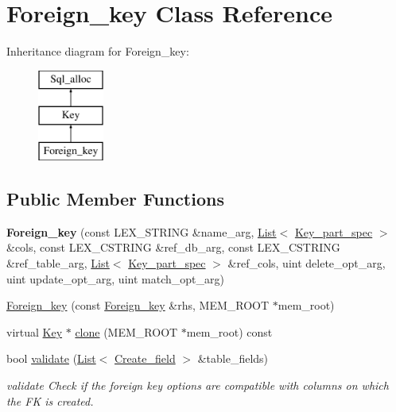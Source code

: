 \hypertarget{classForeign__key}{}\section{Foreign\+\_\+key Class Reference}
\label{classForeign__key}
Inheritance diagram for Foreign\+\_\+key\+:\begin{figure}[H]
\begin{center}
\leavevmode
\includegraphics[height=3.000000cm]{classForeign__key}
\end{center}
\end{figure}
\subsection*{Public Member Functions}
\begin{DoxyCompactItemize}
\item 
\mbox{\label{classForeign__key_a97133887b601057d82301e7fa510763b}} 
{\bfseries Foreign\+\_\+key} (const L\+E\+X\+\_\+\+S\+T\+R\+I\+NG \&name\+\_\+arg, \mbox{\hyperlink{classList}{List}}$<$ \mbox{\hyperlink{classKey__part__spec}{Key\+\_\+part\+\_\+spec}} $>$ \&cols, const L\+E\+X\+\_\+\+C\+S\+T\+R\+I\+NG \&ref\+\_\+db\+\_\+arg, const L\+E\+X\+\_\+\+C\+S\+T\+R\+I\+NG \&ref\+\_\+table\+\_\+arg, \mbox{\hyperlink{classList}{List}}$<$ \mbox{\hyperlink{classKey__part__spec}{Key\+\_\+part\+\_\+spec}} $>$ \&ref\+\_\+cols, uint delete\+\_\+opt\+\_\+arg, uint update\+\_\+opt\+\_\+arg, uint match\+\_\+opt\+\_\+arg)
\item 
\mbox{\hyperlink{classForeign__key_acf9cdeeea91492a4d40dbd34082391e8}{Foreign\+\_\+key}} (const \mbox{\hyperlink{classForeign__key}{Foreign\+\_\+key}} \&rhs, M\+E\+M\+\_\+\+R\+O\+OT $\ast$mem\+\_\+root)
\item 
virtual \mbox{\hyperlink{classKey}{Key}} $\ast$ \mbox{\hyperlink{classForeign__key_a6b95a958ac60355c961a0a173a439678}{clone}} (M\+E\+M\+\_\+\+R\+O\+OT $\ast$mem\+\_\+root) const
\item 
bool \mbox{\hyperlink{classForeign__key_ab89c4b2272ed78736ac27b60d6dcbb19}{validate}} (\mbox{\hyperlink{classList}{List}}$<$ \mbox{\hyperlink{classCreate__field}{Create\+\_\+field}} $>$ \&table\+\_\+fields)
\begin{DoxyCompactList}\small\item\em validate Check if the foreign key options are compatible with columns on which the FK is created. \end{DoxyCompactList}\end{DoxyCompactItemize}
